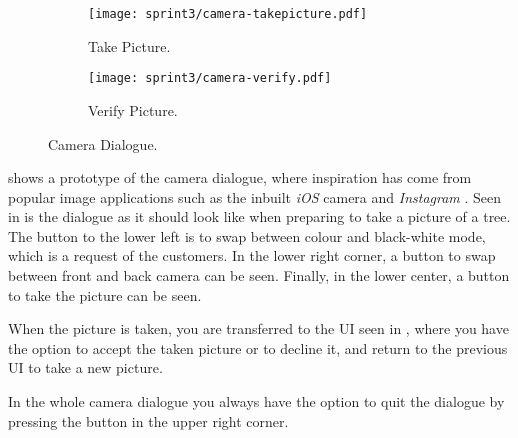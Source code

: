 \begin{figure}[h]
     \centering
     \begin{subfigure}{0.45\textwidth}
          \texttt{[image: sprint3/camera-takepicture.pdf]}
          \caption{Take Picture.}
          \label{fig:cam-takepic}
     \end{subfigure}      
     \begin{subfigure}{0.45\textwidth}
          \texttt{[image: sprint3/camera-verify.pdf]}
          \caption{Verify Picture.}
          \label{fig:cam-verifypic}
     \end{subfigure}
     \caption{Camera Dialogue.}
     \label{fig:cam-dialogue}
\end{figure}

 shows a prototype of the camera dialogue, where inspiration has come from popular image applications such as the inbuilt \textit{iOS} \cite{misc:ios} camera and \textit{Instagram} \citep{misc:instagram}.
Seen in  is the dialogue as it should look like when preparing to take a picture of a tree.
The button to the lower left is to swap between colour and black-white mode, which is a request of the customers.
In the lower right corner, a button to swap between front and back camera can be seen.
Finally, in the lower center, a button to take the picture can be seen.

When the picture is taken, you are transferred to the UI seen in , where you have the option to accept the taken picture or to decline it, and return to the previous UI to take a new picture.

In the whole camera dialogue you always have the option to quit the dialogue by pressing the button in the upper right corner.